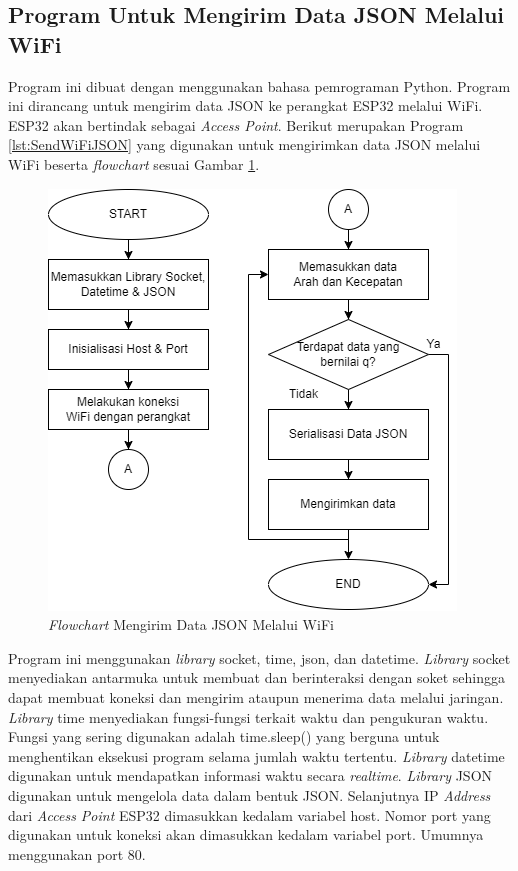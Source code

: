 \subsection{Program Untuk Mengirim Data JSON Melalui WiFi}

Program ini dibuat dengan menggunakan bahasa pemrograman Python. Program ini dirancang untuk mengirim data JSON ke perangkat ESP32 melalui WiFi. ESP32 akan bertindak sebagai \emph{Access Point}. Berikut merupakan Program \ref{lst:SendWiFiJSON} yang digunakan untuk mengirimkan data JSON melalui WiFi beserta \emph{flowchart} sesuai Gambar \ref{fig:Flowchart 12 Mengirim JSON WiFi}.

\begin{figure} [ht] \centering
  \includegraphics[scale=0.7]{gambar/program/12. Mengirim Data JSON WiFi.png}
  \caption{\emph{Flowchart} Mengirim Data JSON Melalui WiFi}
  \label{fig:Flowchart 12 Mengirim JSON WiFi}
\end{figure}

Program ini menggunakan \emph{library} socket, time, json, dan datetime. \emph{Library} socket menyediakan antarmuka untuk membuat dan berinteraksi dengan soket sehingga dapat membuat koneksi dan mengirim ataupun menerima data melalui jaringan. \emph{Library} time menyediakan fungsi-fungsi terkait waktu dan pengukuran waktu. Fungsi yang sering digunakan adalah time.sleep() yang berguna untuk menghentikan eksekusi program selama jumlah waktu tertentu. \emph{Library} datetime digunakan untuk mendapatkan informasi waktu secara \emph{realtime}. \emph{Library} JSON digunakan untuk mengelola data dalam bentuk JSON. Selanjutnya IP \emph{Address} dari \emph{Access Point} ESP32 dimasukkan kedalam variabel host. Nomor port yang digunakan untuk koneksi akan dimasukkan kedalam variabel port. Umumnya menggunakan port 80.

